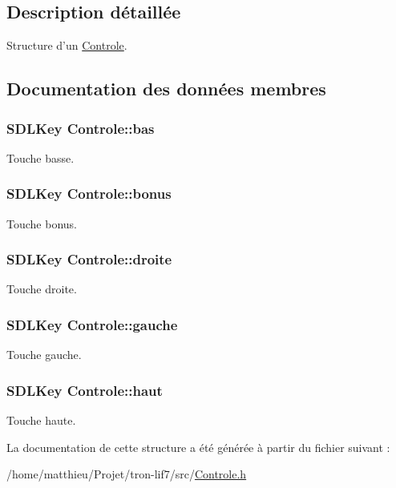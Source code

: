 \subsection{Description détaillée}
Structure d'un \hyperlink{structControle}{Controle}. 

\subsection{Documentation des données membres}
\hypertarget{structControle_a5b5c96bf02d58115b53eaa683f372faf}{
\subsubsection[{bas}]{\setlength{\rightskip}{0pt plus 5cm}S\-D\-L\-Key Controle\-::bas}}\label{structControle_a5b5c96bf02d58115b53eaa683f372faf}
Touche basse. \hypertarget{structControle_ad6ce9209cfccf9b61fbaf5bc149b64e9}{
\subsubsection[{bonus}]{\setlength{\rightskip}{0pt plus 5cm}S\-D\-L\-Key Controle\-::bonus}}\label{structControle_ad6ce9209cfccf9b61fbaf5bc149b64e9}
Touche bonus. \hypertarget{structControle_a1178797db7b9f5956c553feea90b828d}{
\subsubsection[{droite}]{\setlength{\rightskip}{0pt plus 5cm}S\-D\-L\-Key Controle\-::droite}}\label{structControle_a1178797db7b9f5956c553feea90b828d}
Touche droite. \hypertarget{structControle_ae86d63d5b63cd831f57ce8383d5488af}{
\subsubsection[{gauche}]{\setlength{\rightskip}{0pt plus 5cm}S\-D\-L\-Key Controle\-::gauche}}\label{structControle_ae86d63d5b63cd831f57ce8383d5488af}
Touche gauche. \hypertarget{structControle_a515a70782a9e7e6f5fbf9f99815b5ae2}{
\subsubsection[{haut}]{\setlength{\rightskip}{0pt plus 5cm}S\-D\-L\-Key Controle\-::haut}}\label{structControle_a515a70782a9e7e6f5fbf9f99815b5ae2}
Touche haute. 

La documentation de cette structure a été générée à partir du fichier suivant \-:\begin{DoxyCompactItemize}
\item 
/home/matthieu/\-Projet/tron-\/lif7/src/\hyperlink{Controle_8h}{Controle.\-h}\end{DoxyCompactItemize}
